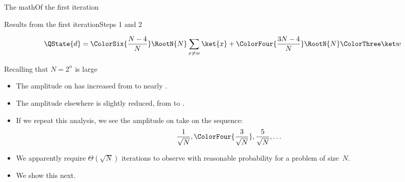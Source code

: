 {\begin{frame}{The math}{Of the first iteration}
{ 
}
    
\end{frame}
\begin{frame}{Results from the first iteration}{Steps 1 and 2}

\Vskip{-3em}\[
\QState{d}  = \ColorSix{\frac{N-4}{N}}\RootN{N}\sum_{x\neq w} \ket{x} + \ColorFour{\frac{3N-4}{N}}\RootN{N}\W \]

Recalling that $N=2^{n}$ is large
\begin{itemize}
    \item The amplitude on \W{} has increased from  to nearly .
    \item The amplitude elsewhere is slightly reduced, from  to .
    \item If we repeat this analysis, we see the amplitude on \W{} take on the sequence:
    \[ \frac{1}{\sqrt{N}}, \ColorFour{\frac{3}{\sqrt{N}}}, \frac{5}{\sqrt{N}}, \ldots
    \]
    \item We apparently require $\Theta(\sqrt{N})$ iterations to observe \W{} with reasonable probability for a problem of size~$N$.
    \item We show this next.
\end{itemize}
    
\end{frame}
}

